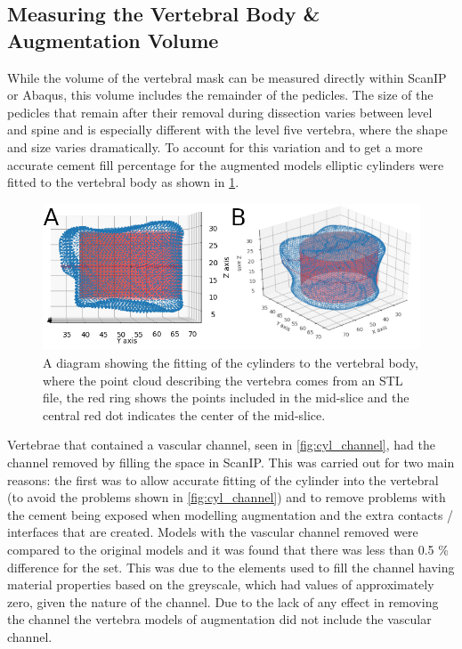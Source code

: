 \subsection{Measuring the Vertebral Body \& Augmentation Volume}

While the volume of the vertebral mask can be measured directly within ScanIP
or Abaqus, this volume includes the remainder of the pedicles.
The size of the pedicles that remain after their removal during dissection
varies between level and spine and is especially different with the level five
vertebra, where the shape and size varies dramatically.
To account for this variation and to get a more accurate cement fill percentage
for the augmented models elliptic cylinders were fitted to the vertebral body
as shown in \cref{fig:cyl_fit}.



\begin{figure}[ht!]
  \centering
 
\includegraphics[width=5in]{Chapters/Chapter_HT_images/cyl_fit_ful_iso_both.png}
  \caption{A diagram showing the fitting of the cylinders to the vertebral
body, where the point cloud describing the vertebra comes from an STL file, the
red ring shows the points included in the mid-slice and the central red dot
indicates the center of the mid-slice.}
  \label{fig:cyl_fit}
\end{figure}

Vertebrae that contained a vascular channel, seen in \cref{fig:cyl_channel},
had the channel removed by filling the space in ScanIP.
This was carried out for two main reasons: the first was to allow accurate
fitting of the cylinder into the vertebral (to avoid the problems shown in
\cref{fig:cyl_channel}) and to remove problems with the cement being exposed
when modelling augmentation and the extra contacts / interfaces that are
created.
Models with the vascular channel removed were compared to the original models
and it was found that there was less than 0.5 \% difference for the set.
This was due to the elements used to fill the channel having material
properties based on the greyscale, which had values of approximately zero,
given the nature of the channel.
Due to the lack of any effect in removing the channel the vertebra models of
augmentation did not include the vascular channel.

